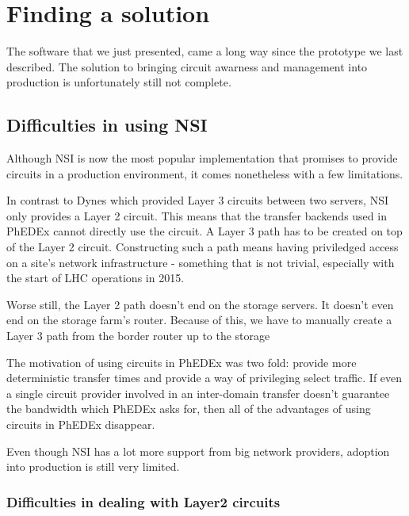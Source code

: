 \section{Finding a solution}

The software that we just presented, came a long way since the prototype we 
last described. The solution to bringing circuit awarness and management into 
production is unfortunately still not complete.

\subsection{Difficulties in using NSI}

Although NSI is now the most popular implementation that promises to provide 
circuits in a production environment, it comes nonetheless with a few limitations.

\begin{description}[style=unboxed,leftmargin=0cm]
  \item[Only provides a layer 2 circuit:] In contrast to Dynes which provided Layer 3 
  circuits between two servers, NSI only provides a Layer 2 circuit. This means that 
  the transfer backends used in PhEDEx cannot directly use the circuit. A Layer 3 path 
  has to be created on top of the Layer 2 circuit. Constructing such a path means 
  having priviledged access on a site's network infrastructure - something that is 
  not trivial, especially with the start of LHC operations in 2015.
  \item[Circuit ends at the border router:] Worse still, the Layer 2 path doesn't end 
  on the storage servers. It doesn't even end on the storage farm's router. Because of 
  this, we have to manually create a Layer 3 path from the border router up to the storage 
  \item[Some providers don't guarantee bandwidth:] The motivation of using circuits 
  in PhEDEx was two fold: provide more deterministic transfer times and provide a way of 
  privileging select traffic. If even a single circuit provider involved in an 
  inter-domain transfer doesn't guarantee the bandwidth which PhEDEx asks for, 
  then all of the advantages of using circuits in PhEDEx disappear.
  \item[NSI adoption is still limited:] Even though NSI has a lot more support from 
  big network providers, adoption into production is still very limited. 
\end{description}

\subsubsection{Difficulties in dealing with Layer2 circuits}

